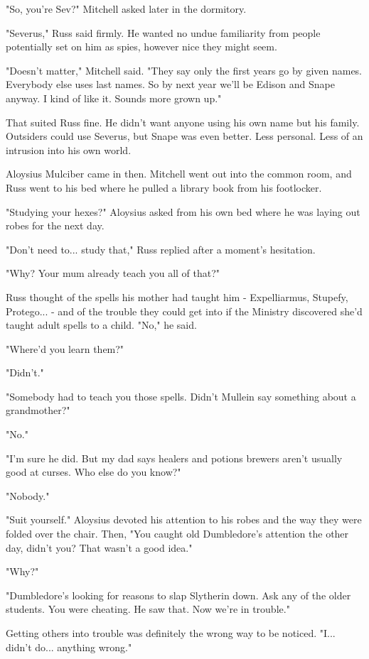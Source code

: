 \documentclass[a4paper,11pt]{article}
\begin{document}
"So, you're Sev?" Mitchell asked later in the dormitory.

"Severus," Russ said firmly. He wanted no undue familiarity from people potentially set on him as spies, however nice they might seem.

"Doesn't matter," Mitchell said. "They say only the first years go by given names. Everybody else uses last names. So by next year we'll be Edison and Snape anyway. I kind of like it. Sounds more grown up."

That suited Russ fine. He didn't want anyone using his own name but his family. Outsiders could use Severus, but Snape was even better. Less personal. Less of an intrusion into his own world.

Aloysius Mulciber came in then. Mitchell went out into the common room, and Russ went to his bed where he pulled a library book from his footlocker.

"Studying your hexes?" Aloysius asked from his own bed where he was laying out robes for the next day.

"Don't need to... study that," Russ replied after a moment's hesitation.

"Why? Your mum already teach you all of that?"

Russ thought of the spells his mother had taught him - Expelliarmus, Stupefy, Protego... - and of the trouble they could get into if the Ministry discovered she'd taught adult spells to a child. "No," he said.

"Where'd you learn them?"

"Didn't."

"Somebody had to teach you those spells. Didn't Mullein say something about a grandmother?"

"No."

"I'm sure he did. But my dad says healers and potions brewers aren't usually good at curses. Who else do you know?"

"Nobody."

"Suit yourself." Aloysius devoted his attention to his robes and the way they were folded over the chair. Then, "You caught old Dumbledore's attention the other day, didn't you? That wasn't a good idea."

"Why?"

"Dumbledore's looking for reasons to slap Slytherin down. Ask any of the older students. You were cheating. He saw that. Now we're in trouble."

Getting others into trouble was definitely the wrong way to be noticed. "I... didn't do... anything wrong."
\end{document}

